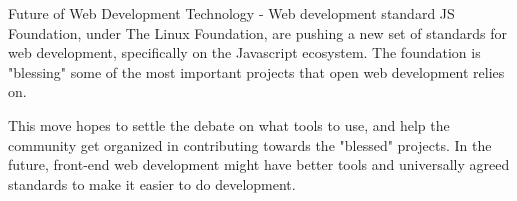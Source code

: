 \documentclass{beamer}
\begin{document}
  \begin{frame}{Future of Web Development Technology - Web development standard}
	JS Foundation, under The Linux Foundation, are pushing a new set of standards for web development, specifically on the Javascript ecosystem. The foundation is "blessing" some of the most important projects that  open web development relies on. 
	
	This move hopes to settle the debate on what tools to use, and help the community get organized in contributing towards the "blessed" projects. In the future, front-end web development might have better tools and universally agreed standards to make it easier to do development.
  \end{frame}
\end{document}
